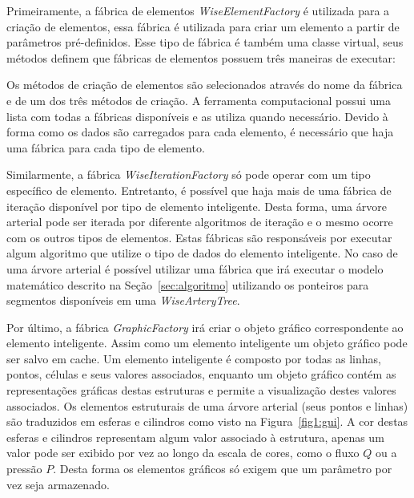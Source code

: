 Primeiramente, a fábrica de elementos \textit{WiseElementFactory} é utilizada para a criação de elementos, essa fábrica é utilizada para criar um elemento a partir de parâmetros pré-definidos. Esse tipo de fábrica é também uma classe virtual, seus métodos definem que fábricas de elementos possuem três maneiras de executar: 

Os métodos de criação de elementos são selecionados através do nome da fábrica e de um dos três métodos de criação. A ferramenta computacional possui uma lista com todas a fábricas disponíveis e as utiliza quando necessário. Devido à forma como os dados são carregados para cada elemento, é necessário que haja uma fábrica para cada tipo de elemento.

Similarmente, a fábrica \textit{WiseIterationFactory} só pode operar com um tipo específico de elemento. Entretanto, é possível que haja mais de uma fábrica de iteração disponível por tipo de elemento inteligente. Desta forma, uma árvore arterial pode ser iterada por diferente algoritmos de iteração e o mesmo ocorre com os outros tipos de elementos. Estas fábricas são responsáveis por executar algum algoritmo que utilize o tipo de dados do elemento inteligente. No caso de uma árvore arterial é possível utilizar uma fábrica que irá executar o modelo matemático descrito na Seção~\ref{sec:algoritmo} utilizando os ponteiros para segmentos disponíveis em uma \textit{WiseArteryTree}.

Por último, a fábrica \textit{GraphicFactory} irá criar o objeto gráfico correspondente ao elemento inteligente. Assim como um elemento inteligente um objeto gráfico pode ser salvo em cache.  Um elemento inteligente é composto por todas as linhas, pontos, células e seus valores associados, enquanto um objeto gráfico contém as representações gráficas destas estruturas e permite a visualização destes valores associados. Os elementos estruturais de uma árvore arterial (seus pontos e linhas) são traduzidos em esferas e cilindros como visto na Figura~\ref{fig1:gui}. A cor destas esferas e cilindros representam algum valor associado à estrutura, apenas um valor pode ser exibido por vez ao longo da escala de cores, como o fluxo $Q$ ou a pressão $P$. Desta forma os elementos gráficos só exigem que um parâmetro por vez seja armazenado.


